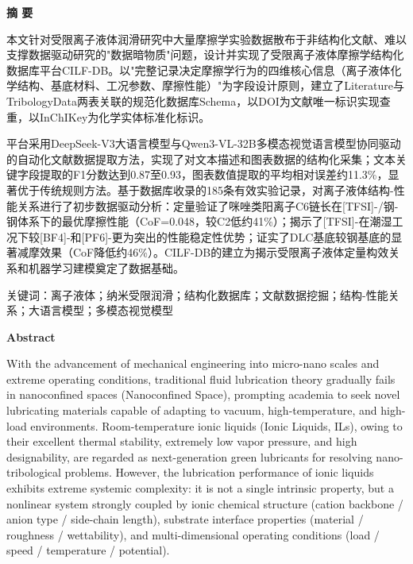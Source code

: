 \textbf{摘 要}

本文针对受限离子液体润滑研究中大量摩擦学实验数据散布于非结构化文献、难以支撑数据驱动研究的"数据暗物质"问题，设计并实现了受限离子液体摩擦学结构化数据库平台CILF-DB。以"完整记录决定摩擦学行为的四维核心信息（离子液体化学结构、基底材料、工况参数、摩擦性能）"为字段设计原则，建立了Literature与TribologyData两表关联的规范化数据库Schema，以DOI为文献唯一标识实现查重，以InChIKey为化学实体标准化标识。

平台采用DeepSeek-V3大语言模型与Qwen3-VL-32B多模态视觉语言模型协同驱动的自动化文献数据提取方法，实现了对文本描述和图表数据的结构化采集；文本关键字段提取的F1分数达到0.87至0.93，图表数值提取的平均相对误差约11.3\%，显著优于传统规则方法。基于数据库收录的185条有效实验记录，对离子液体结构-性能关系进行了初步数据驱动分析：定量验证了咪唑类阳离子C6链长在{[}TFSI{]}-/钢-钢体系下的最优摩擦性能（CoF=0.048，较C2低约41\%）；揭示了{[}TFSI{]}-在潮湿工况下较{[}BF4{]}-和{[}PF6{]}-更为突出的性能稳定性优势；证实了DLC基底较钢基底的显著减摩效果（CoF降低约46\%）。CILF-DB的建立为揭示受限离子液体定量构效关系和机器学习建模奠定了数据基础。

关键词：离子液体；纳米受限润滑；结构化数据库；文献数据挖掘；结构-性能关系；大语言模型；多模态视觉模型

\textbf{Abstract}

With the advancement of mechanical engineering into micro-nano scales and extreme operating conditions, traditional fluid lubrication theory gradually fails in nanoconfined spaces (Nanoconfined Space), prompting academia to seek novel lubricating materials capable of adapting to vacuum, high-temperature, and high-load environments. Room-temperature ionic liquids (Ionic Liquids, ILs), owing to their excellent thermal stability, extremely low vapor pressure, and high designability, are regarded as next-generation green lubricants for resolving nano-tribological problems. However, the lubrication performance of ionic liquids exhibits extreme systemic complexity: it is not a single intrinsic property, but a nonlinear system strongly coupled by ionic chemical structure (cation backbone / anion type / side-chain length), substrate interface properties (material / roughness / wettability), and multi-dimensional operating conditions (load / speed / temperature / potential).

